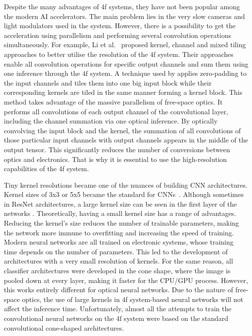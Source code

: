 \documentclass{article}
\begin{document}
Despite the many advantages of 4f systems, they have not been popular among the modern AI accelerators. The main problem lies in the very slow cameras and light modulators used in the system. However, there is a possibility to get the acceleration using parallelism and performing several convolution operations simultaneously. For example, Li et al.~\cite{li_channel_2020}  proposed kernel, channel and mixed tiling approaches to better utilise the resolution of the 4f system. Their approaches enable all convolution operations for specific output channels and sum them using one inference through the 4f system. A technique used by \cite{li_channel_2020} applies zero-padding to the input channels and tiles them into one big input block while their corresponding kernels are tiled in the same manner forming a kernel block. This method takes advantage of the massive parallelism of free-space optics. It performs all convolutions of each output channel of the convolutional layer, including the channel summation via one optical inference. By optically convolving the input block and the kernel, the summation of all convolutions of those particular input channels with output channels appears in the middle of the output tensor. This significantly reduces the number of conversions between optics and electronics. That is why it is essential to use the high-resolution capabilities of the 4f system. 

Tiny kernel resolutions became one of the nuances of building CNN architectures. Kernel sizes of 3x3 or 5x5 became the standard for CNNs~\cite{krizhevsky_imagenet_2017}. Although sometimes in ResNet architectures, a large kernel size can be seen in the first layer of the networks  \cite{he_deep_2016}. Theoretically, having a small kernel size has a range of advantages. Reducing the kernel's size reduces the number of trainable parameters, making the network more immune to overfitting and increasing the speed of training. Modern neural networks are all trained on electronic systems, whose training time depends on the number of parameters. This led to the development of architectures with a very small resolution of kernels.
For the same reason, all classifier architectures were developed in the cone shape, where the image is pooled down at every layer, making it faster for the CPU/GPU process. However, this works entirely different for optical neural networks. Due to the nature of free-space optics, the use of large kernels in 4f system-based neural networks will not affect the inference time. Unfortunately, almost all the attempts to train the convolutional neural networks on the 4f system were based on the standard convolutional cone-shaped architectures. 
\end{document}
